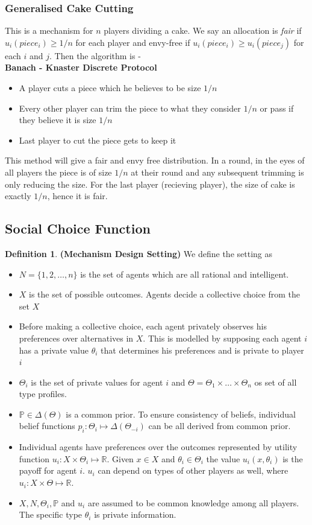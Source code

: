 \documentclass{article}
\theoremstyle{definition}
\newtheorem{defn}{Definition}[section]
\begin{document}
\subsubsection{Generalised Cake Cutting}
This is a mechanism for $n$ players dividing a cake. We say an allocation is \textit{fair} if $u_i(piece_i) \geq 1/n$ for each player and envy-free if $u_i(piece_i)\geq u_i(piece_j)$ for each $i$ and $j$. Then the algorithm is - \\
\textbf{Banach - Knaster Discrete Protocol}
\begin{itemize}
	\item A player cuts a piece which he believes to be size $1/n$
	\item Every other player can trim the piece to what they consider $1/n$ or pass if they believe it is size $1/n$
	\item Last player to cut the piece gets to keep it
\end{itemize}
This method will give a fair and envy free distribution. In a round, in the eyes of all players the piece is of size $1/n$ at their round and any subsequent trimming is only reducing the size. For the last player (recieving player), the size of cake is exactly $1/n$, hence it is fair. 
\subsection{Social Choice Function}
\begin{defn}
\textbf{(Mechanism Design Setting)} We define the setting as 
\begin{itemize}
	\item $N = \{1,2,\dots,n\}$ is the set of agents which are all rational and intelligent.
	\item $X$ is the set of possible outcomes. Agents decide a collective choice from the set $X$
	\item Before making a collective choice, each agent privately observes his preferences over alternatives in $X$. This is modelled by supposing each agent $i$ has a private value $\theta_i$ that determines his preferences and is private to player $i$
	\item $\Theta_i$ is the set of private values for agent $i$ and $\Theta = \Theta_1\times\dots\times\Theta_n$ os set of all type profiles.
	\item $\mathbb{P}\in \Delta(\Theta)$ is a common prior. To ensure consistency of beliefs, individual belief functions $p_i:\Theta_i \mapsto \Delta(\Theta_{-i})$ can be all derived from common prior.
	\item Individual agents have preferences over the outcomes represented by utility function $u_i : X\times \Theta_i \mapsto \mathbb{R}$. Given $x\in X$ and $\theta_i \in \Theta_i$ the value $u_i(x,\theta_i)$ is the payoff for agent $i$. $u_i$ can depend on types of other players as well, where $u_i: X\times \Theta \mapsto \mathbb{R}$.
	\item $X,N,\Theta_i,\mathbb{P}$ and $u_i$ are assumed to be common knowledge among all players. The specific type $\theta_i$ is private information.
\end{itemize}
\end{defn}
\end{document}
